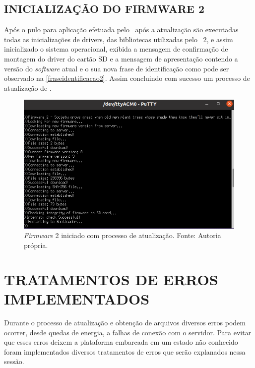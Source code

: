 \subsection{INICIALIZAÇÃO DO FIRMWARE 2}
Após o pulo para aplicação efetuada pelo \bootloader\ após a atualização são executadas todas as inicializações de drivers, das bibliotecas utilizadas pelo \firmware\ 2, e assim inicializado o sistema operacional, exibida a mensagem de confirmação de montagem do driver do cartão SD e a mensagem de apresentação contendo a versão do \textit{software} atual e o sua nova frase de identificação como pode ser observado na \autoref{fraseidentificacao2}. Assim concluindo com sucesso um processo de atualização de \firmware.

\begin{figure}[H]
    \scriptsize
     \centering
     \includegraphics[scale=0.9]{dados/figuras/Firmware2.png}
     \caption{\textit{Firmware} 2 iniciado com processo de atualização. \newline Fonte: Autoria própria.}
     \label{fraseidentificacao2}
\end{figure}

\section{TRATAMENTOS DE ERROS IMPLEMENTADOS}
Durante o processo de atualização e obtenção de arquivos diversos erros podem ocorrer, desde quedas de energia, a falhas de conexão com o servidor. Para evitar que esses erros deixem a plataforma embarcada em um estado não conhecido foram implementados diversos tratamentos de erros que serão explanados nessa sessão.

